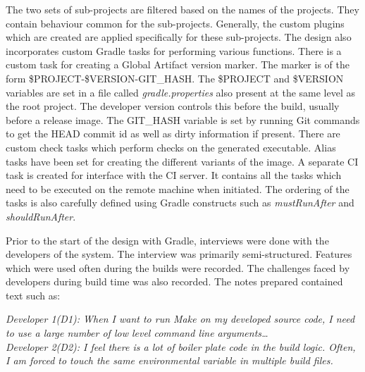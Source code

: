 \documentclass[12pt, a4paper, titlepage]{scrartcl}
\begin{document}
\par The two sets of sub-projects are filtered based on the names of the projects. They contain behaviour common for the sub-projects. Generally, the custom plugins which are created are applied specifically for these sub-projects. The design also incorporates custom Gradle tasks for performing various functions. There is a custom task for creating a Global Artifact version marker. The marker is of the form \$PROJECT-\$VERSION-GIT\_HASH. The \$PROJECT and \$VERSION variables are set in a file called \emph{gradle.properties} also present at the same level as the root project. The developer version controls this before the build, usually before a release image. The GIT\_HASH variable is set by running Git commands to get the HEAD commit id as well as dirty information if present. There are custom check tasks which perform checks on the generated executable. Alias tasks have been set for creating the different variants of the image. A separate CI task is created for interface with the CI server. It contains all the tasks which need to be executed on the remote machine when initiated. The ordering of the tasks is also carefully defined using Gradle constructs such as \emph{mustRunAfter} and \emph{shouldRunAfter}.
\par Prior to the start of the design with Gradle, interviews were done with the developers of the system. The interview was primarily semi-structured. Features which were used often during the builds were recorded. The challenges faced by developers during build time was also recorded. The notes prepared contained text such as:

\textit{Developer 1(D1): When I want to run Make on my developed source code, I need to use a large number of low level command line arguments\ldots}\\
\textit{Developer 2(D2): I feel there is a lot of boiler plate code in the build logic. Often, I am forced to touch the same environmental variable in multiple build files. }
\end{document}
